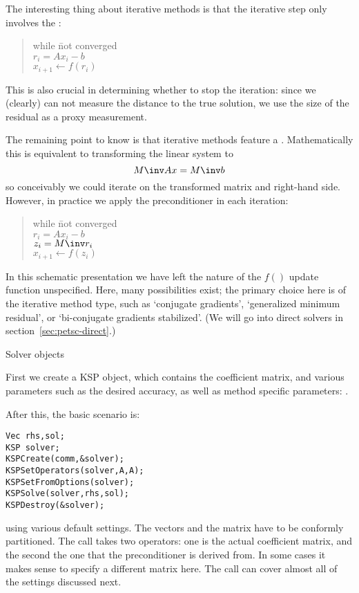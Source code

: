 The interesting thing about iterative methods is that the iterative step
only involves the :

\begin{quote}
  \begin{tabbing}
    while \=not converged\\
    \> $r_i = Ax_i-b$\\
    \> $x_{i+1}\leftarrow f(r_i)$
  \end{tabbing}
\end{quote}

This  is also crucial in determining whether to stop the iteration:
since we (clearly) can not measure the distance to the true solution, we use
the size of the residual as a proxy measurement.

The remaining point to know is that iterative methods feature a .
Mathematically this is equivalent to transforming the linear system to
\[ M\inv Ax=M\inv b \]
so conceivably we could iterate on the transformed matrix and right-hand side.
However, in practice we apply the preconditioner in each iteration:

\begin{quote}
  \begin{tabbing}
    while \=not converged\\
    \> $r_i = Ax_i-b$\\
    \> $z_i = M\inv r_i$\\
    \> $x_{i+1}\leftarrow f(z_i)$
  \end{tabbing}
\end{quote}

In this schematic presentation we have left the nature of the $f()$ update
function unspecified. Here, many possibilities exist; the primary
choice here is of the iterative method type, such as `conjugate gradients',
`generalized minimum residual', or `bi-conjugate gradients stabilized'.
(We will go into direct solvers in section~\ref{sec:petsc-direct}.)

 {Solver objects}

First we create a KSP object, which contains the coefficient matrix,
and various parameters such as the desired accuracy,
as well as method specific parameters:
%
.

After this, the basic scenario is:
\begin{lstlisting}
Vec rhs,sol;
KSP solver;
KSPCreate(comm,&solver);
KSPSetOperators(solver,A,A);
KSPSetFromOptions(solver);
KSPSolve(solver,rhs,sol);
KSPDestroy(&solver);
\end{lstlisting}
using various default settings. The vectors and the matrix have to be
conformly partitioned. The  call
takes two operators: one is the actual coefficient matrix, and the second
the one that the preconditioner is derived from. In some cases it makes sense
to specify a different matrix here.
The call  can cover almost all of the 
settings discussed next.

